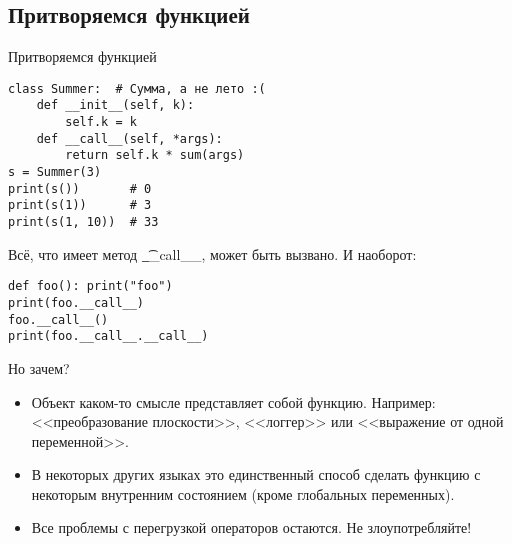 \subsection{Притворяемся функцией}
\begin{frame}
\end{frame}

\begin{frame}[fragile]{Притворяемся функцией}
\begin{verbatim}
class Summer:  # Сумма, а не лето :(
    def __init__(self, k):
        self.k = k
    def __call__(self, *args):
        return self.k * sum(args)
s = Summer(3)
print(s())       # 0
print(s(1))      # 3
print(s(1, 10))  # 33
\end{verbatim}
	Всё, что имеет метод \t{\_\_call\_\_}, может быть вызвано.
	И наоборот:
\begin{verbatim}
def foo(): print("foo")
print(foo.__call__)
foo.__call__()
print(foo.__call__.__call__)
\end{verbatim}
\end{frame}

\begin{frame}{Но зачем?}
	\begin{itemize}
		\item
			Объект каком-то смысле представляет собой функцию.
			Например: <<преобразование плоскости>>, <<логгер>> или <<выражение от одной переменной>>.
		\item
			В некоторых других языках это единственный способ сделать функцию с некоторым внутренним состоянием (кроме глобальных переменных).
		\item
			Все проблемы с перегрузкой операторов остаются.
			Не злоупотребляйте!
	\end{itemize}
\end{frame}
